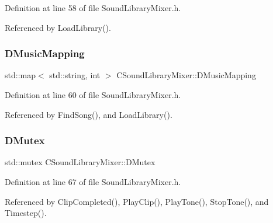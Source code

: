 Definition at line 58 of file Sound\+Library\+Mixer.\+h.



Referenced by Load\+Library().

\hypertarget{classCSoundLibraryMixer_ada2510450315651ebe948ce63960b98a}{}\label{classCSoundLibraryMixer_ada2510450315651ebe948ce63960b98a} 
\subsubsection{\texorpdfstring{D\+Music\+Mapping}{DMusicMapping}}
{\footnotesize\ttfamily std\+::map$<$ std\+::string, int $>$ C\+Sound\+Library\+Mixer\+::\+D\+Music\+Mapping\hspace{0.3cm}{\ttfamily [protected]}}



Definition at line 60 of file Sound\+Library\+Mixer.\+h.



Referenced by Find\+Song(), and Load\+Library().

\hypertarget{classCSoundLibraryMixer_a955562a0638df831413a1c6b8860f9fb}{}\label{classCSoundLibraryMixer_a955562a0638df831413a1c6b8860f9fb} 
\subsubsection{\texorpdfstring{D\+Mutex}{DMutex}}
{\footnotesize\ttfamily std\+::mutex C\+Sound\+Library\+Mixer\+::\+D\+Mutex\hspace{0.3cm}{\ttfamily [protected]}}



Definition at line 67 of file Sound\+Library\+Mixer.\+h.



Referenced by Clip\+Completed(), Play\+Clip(), Play\+Tone(), Stop\+Tone(), and Timestep().

\hypertarget{classCSoundLibraryMixer_a9bbd8e4d0945a06cdb3b21aa05ddeb60}{}\label{classCSoundLibraryMixer_a9bbd8e4d0945a06cdb3b21aa05ddeb60} 
